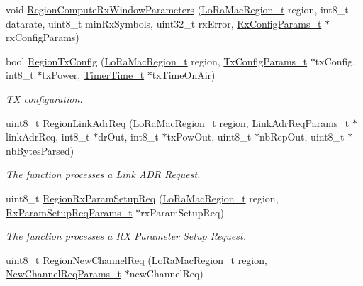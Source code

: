 \begin{DoxyCompactItemize}
void \hyperlink{group__REGION_gabd3eb4e7db9b7987fabb9568f733a2b9}{Region\+Compute\+Rx\+Window\+Parameters} (\hyperlink{group__LORAMAC_ga80c48efda9ae02e14b58160d34a798dd}{Lo\+Ra\+Mac\+Region\+\_\+t} region, int8\+\_\+t datarate, uint8\+\_\+t min\+Rx\+Symbols, uint32\+\_\+t rx\+Error, \hyperlink{group__REGION_ga375c038078dfcfc7ef14280021db719e}{Rx\+Config\+Params\+\_\+t} $\ast$rx\+Config\+Params)
\item 
bool \hyperlink{group__REGION_ga9a4b01301e0f6f6880dc6a651c062ad0}{Region\+Tx\+Config} (\hyperlink{group__LORAMAC_ga80c48efda9ae02e14b58160d34a798dd}{Lo\+Ra\+Mac\+Region\+\_\+t} region, \hyperlink{group__REGION_gabed730d4d04b0b60d4b6d1966d3f21d3}{Tx\+Config\+Params\+\_\+t} $\ast$tx\+Config, int8\+\_\+t $\ast$tx\+Power, \hyperlink{utilities_8h_a4215ca43d3e953099ea758ce428599d0}{Timer\+Time\+\_\+t} $\ast$tx\+Time\+On\+Air)
\begin{DoxyCompactList}\small\item\em TX configuration. \end{DoxyCompactList}\item 
uint8\+\_\+t \hyperlink{group__REGION_gae82a94e6d4141122e1a20b5ba1936c8e}{Region\+Link\+Adr\+Req} (\hyperlink{group__LORAMAC_ga80c48efda9ae02e14b58160d34a798dd}{Lo\+Ra\+Mac\+Region\+\_\+t} region, \hyperlink{group__REGION_gad4af503e8d4de1846129e26a799a1e8e}{Link\+Adr\+Req\+Params\+\_\+t} $\ast$link\+Adr\+Req, int8\+\_\+t $\ast$dr\+Out, int8\+\_\+t $\ast$tx\+Pow\+Out, uint8\+\_\+t $\ast$nb\+Rep\+Out, uint8\+\_\+t $\ast$nb\+Bytes\+Parsed)
\begin{DoxyCompactList}\small\item\em The function processes a Link A\+DR Request. \end{DoxyCompactList}\item 
uint8\+\_\+t \hyperlink{group__REGION_ga485a820155fded42235a0d14d5918a7d}{Region\+Rx\+Param\+Setup\+Req} (\hyperlink{group__LORAMAC_ga80c48efda9ae02e14b58160d34a798dd}{Lo\+Ra\+Mac\+Region\+\_\+t} region, \hyperlink{group__REGION_ga7165f282c670c728c36d534df2285157}{Rx\+Param\+Setup\+Req\+Params\+\_\+t} $\ast$rx\+Param\+Setup\+Req)
\begin{DoxyCompactList}\small\item\em The function processes a RX Parameter Setup Request. \end{DoxyCompactList}\item 
uint8\+\_\+t \hyperlink{group__REGION_gadca654538335b4395c8d54642b83e2d4}{Region\+New\+Channel\+Req} (\hyperlink{group__LORAMAC_ga80c48efda9ae02e14b58160d34a798dd}{Lo\+Ra\+Mac\+Region\+\_\+t} region, \hyperlink{group__REGION_gae2abcdb6dbb843c9faf5fd3009eca9d6}{New\+Channel\+Req\+Params\+\_\+t} $\ast$new\+Channel\+Req)

\end{DoxyCompactItemize}
